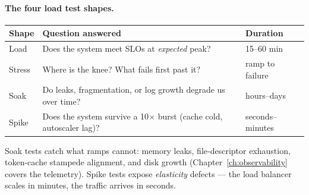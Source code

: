 \paragraph{The four load test shapes.}
\begin{center}
\begin{tabularx}{\textwidth}{l X l}
\toprule
\textbf{Shape} & \textbf{Question answered} & \textbf{Duration} \\
\midrule
Load   & Does the system meet SLOs at \emph{expected} peak? & 15--60 min \\
Stress & Where is the knee? What fails first past it? & ramp to failure \\
Soak   & Do leaks, fragmentation, or log growth degrade us over time? & hours--days \\
Spike  & Does the system survive a 10$\times$ burst (cache cold, autoscaler lag)? & seconds--minutes \\
\bottomrule
\end{tabularx}
\end{center}

Soak tests catch what ramps cannot: memory leaks, file-descriptor
exhaustion, token-cache stampede alignment, and disk growth
(Chapter~\ref{ch:observability} covers the telemetry). Spike tests expose
\emph{elasticity} defects --- the load balancer scales in minutes, the
traffic arrives in seconds.

